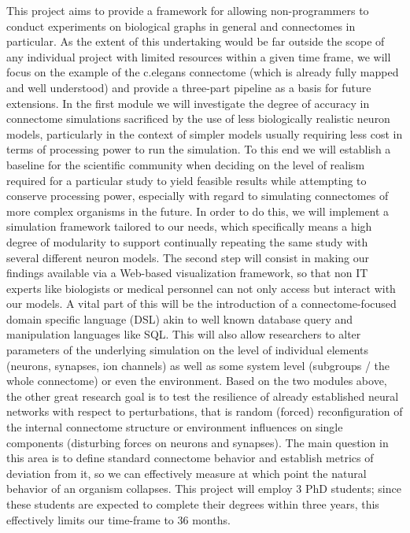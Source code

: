 \documentclass[a4paper,11pt]{article}
\begin{document}
This project aims to provide a framework for allowing non-programmers to conduct experiments on biological graphs in general and connectomes in particular. As the extent of this undertaking would be far outside the scope of any individual project with limited resources within a given time frame, we will focus on the example of the c.elegans connectome (which is already fully mapped and well understood) and provide a three-part pipeline as a basis for future extensions. In the first module we will investigate the degree of accuracy in connectome simulations sacrificed by the use of less biologically realistic neuron models, particularly in the context of simpler models usually requiring less cost in terms of processing power to run the simulation. To this end we will establish a baseline for the scientific community when deciding on the level of realism required for a particular study to yield feasible results while attempting to conserve processing power, especially with regard to simulating connectomes of more complex organisms in the future. In order to do this, we will implement a simulation framework tailored to our needs, which specifically means a high degree of modularity to support continually repeating the same study with several different neuron models. The second step will consist in making our findings available via a Web-based visualization framework, so that non IT experts like biologists or medical personnel can not only access but interact with our models. A vital part of this will be the introduction of a connectome-focused domain specific language (DSL) akin to well known database query and manipulation languages like SQL. This will also allow researchers to alter parameters of the underlying simulation on the level of individual elements (neurons, synapses, ion channels) as well as some system level (subgroups / the whole connectome) or even the environment. Based on the two modules above, the other great research goal is to test the resilience of already established neural networks with respect to perturbations, that is random (forced) reconfiguration of the internal connectome structure or environment influences on single components (disturbing forces on neurons and synapses). The main question in this area is to define standard connectome behavior and establish metrics of deviation from it, so we can effectively measure at which point the natural behavior of an organism collapses. This project will employ 3 PhD students; since these students are expected to complete their degrees within three years, this effectively limits our time-frame to 36 months.
\end{document}
